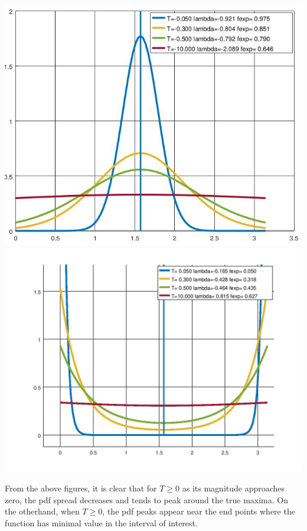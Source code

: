 \documentclass{article}
\begin{document}
\begin{tcolorbox}[fonttitle=\sffamily\bfseries\large,
  title={$sin(x)$} ]
    \centering
     
\end{tcolorbox}

\begin{tcolorbox}[fonttitle=\sffamily\bfseries\large,
  title={Change in pdf with T when $T \le 0$ and $T \ge 0$} ]
     \includegraphics[scale=0.25]{fig1.jpg}
     \hspace{1cm}
     \includegraphics[scale=0.32]{fig2.jpg}
\end{tcolorbox}


From the above figures, it is clear that for $T \ge 0$ as its 
magnitude approaches zero, the pdf spread decreases and
tends to peak around the true maxima. On the otherhand,
when $T \ge 0$, the pdf peaks appear near the end points where
the function has minimal value in the interval of interest. 
\end{document}
